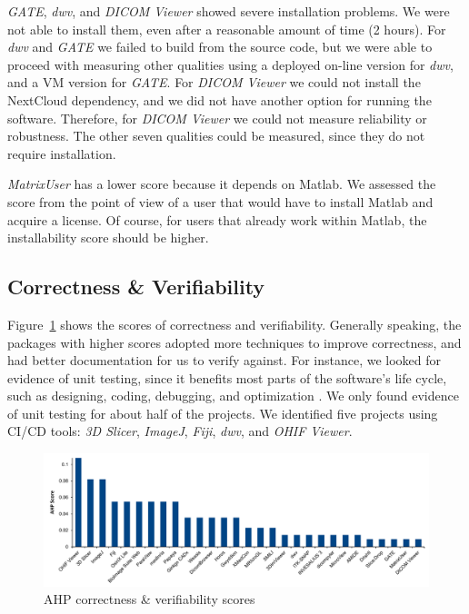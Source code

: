 \documentclass[11pt]{article}
\begin{document}
\textit{GATE}, \textit{dwv}, and \textit{DICOM Viewer} showed severe
installation problems. We were not able to install them, even after a reasonable
amount of time (2 hours).  For \textit{dwv} and \textit{GATE} we failed to build
from the source code, but we were able to proceed with measuring other qualities
using a deployed on-line version for \textit{dwv}, and a VM version for
\textit{GATE}. For \textit{DICOM Viewer} we could not install the NextCloud
dependency, and we did not have another option for running the software.
Therefore, for \textit{DICOM Viewer} we could not measure reliability or
robustness.  The other seven qualities could be measured, since they do not
require installation.

\textit{MatrixUser} has a lower score because it depends on Matlab. We assessed
the score from the point of view of a user that would have to install Matlab and
acquire a license.  Of course, for users that already work within Matlab, the
installability score should be higher.

\subsection{Correctness \& Verifiability} \label{sec_result_correctness_verifiability}

Figure~\ref{fg_correctness_verifiability_scores} shows the scores of correctness
and verifiability. Generally speaking, the packages with higher scores adopted
more techniques to improve correctness, and had better documentation for us to
verify against.  For instance, we looked for evidence of unit testing, since it
benefits most parts of the software's life cycle, such as designing, coding,
debugging, and optimization \cite{Hamill2004}.  We only found evidence of unit
testing for about half of the projects. We identified five projects using CI/CD
tools: \textit{3D Slicer}, \textit{ImageJ}, \textit{Fiji}, \textit{dwv}, and
\textit{OHIF Viewer}.

\begin{figure}[!ht]
\includegraphics[scale=0.47]{correctness_verifiability_scores.pdf}
\caption{AHP correctness \& verifiability scores}
\label{fg_correctness_verifiability_scores}
\end{figure}
\end{document}
